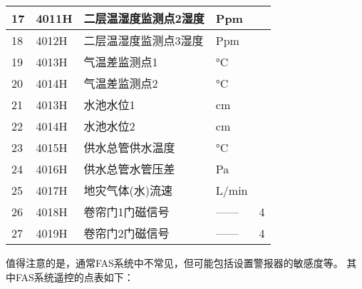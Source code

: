 \begin{longtable}[c]{|l|l|l|l|l|}
	17          & 4011H          & 二层温湿度监测点2湿度    & Ppm         &             \\ \hline
	18          & 4012H          & 二层温湿度监测点3湿度    & Ppm         &             \\ \hline
	19          & 4013H          & 气温差监测点1        & °C          &             \\ \hline
	20          & 4014H          & 气温差监测点2        & °C          &             \\ \hline
	21          & 4013H          & 水池水位1          & cm          &             \\ \hline
	22          & 4014H          & 水池水位2          & cm          &             \\ \hline
	23          & 4015H          & 供水总管供水温度       & °C          &             \\ \hline
	24          & 4016H          & 供水总管水管压差       & Pa          &             \\ \hline
	25          & 4017H          & 地灾气体(水)流速      & L/min       &             \\ \hline
	26          & 4018H          & 卷帘门1门磁信号       & ——          & 4           \\ \hline
	27          & 4019H          & 卷帘门2门磁信号       & ——          & 4           \\ \hline
\end{longtable}

值得注意的是，通常FAS系统中不常见，但可能包括设置警报器的敏感度等。
其中FAS系统遥控的点表如下：

